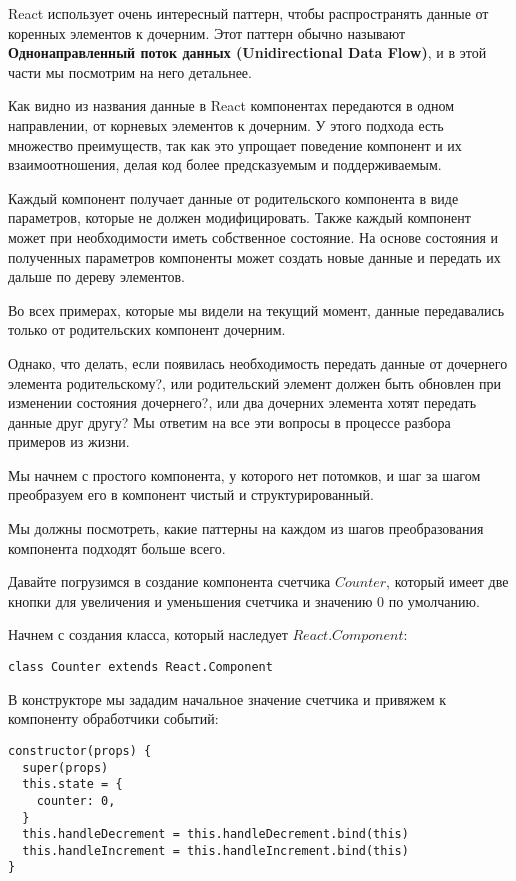 React использует очень интересный паттерн, чтобы распространять данные от коренных элементов к дочерним. Этот паттерн обычно называют \textbf{Однонаправленный поток данных (Unidirectional Data Flow)}, и в этой части мы посмотрим на него детальнее.

Как видно из названия данные в React компонентах передаются в одном направлении, от корневых элементов к дочерним. У этого подхода есть множество преимуществ, так как это упрощает поведение компонент и их взаимоотношения, делая код более предсказуемым и поддерживаемым.

Каждый компонент получает данные от родительского компонента в виде параметров, которые не должен модифицировать. Также каждый компонент может при необходимости иметь собственное состояние. На основе состояния и полученных параметров компоненты может создать новые данные и передать их дальше по дереву элементов.

Во всех примерах, которые мы видели на текущий момент, данные передавались только от родительских компонент дочерним.

Однако, что делать, если появилась необходимость передать данные от дочернего элемента родительскому?, или родительский элемент должен быть обновлен при изменении состояния дочернего?, или два дочерних элемента хотят передать данные друг другу? Мы ответим на все эти вопросы в процессе разбора примеров из жизни.

Мы начнем с простого компонента, у которого нет потомков, и шаг за шагом преобразуем его в компонент чистый и структурированный.

Мы должны посмотреть, какие паттерны на каждом из шагов преобразования компонента подходят больше всего.

Давайте погрузимся в создание компонента счетчика $Counter$, который имеет две кнопки для увеличения и уменьшения счетчика и значению $0$ по умолчанию.

Начнем с создания класса, который наследует $React.Component$:

\begin{lstlisting}
class Counter extends React.Component
\end{lstlisting}

В конструкторе мы зададим начальное значение счетчика и привяжем к компоненту обработчики событий:

\begin{lstlisting}
constructor(props) {
  super(props)
  this.state = {
    counter: 0,
  }
  this.handleDecrement = this.handleDecrement.bind(this)
  this.handleIncrement = this.handleIncrement.bind(this)
}	
\end{lstlisting}

